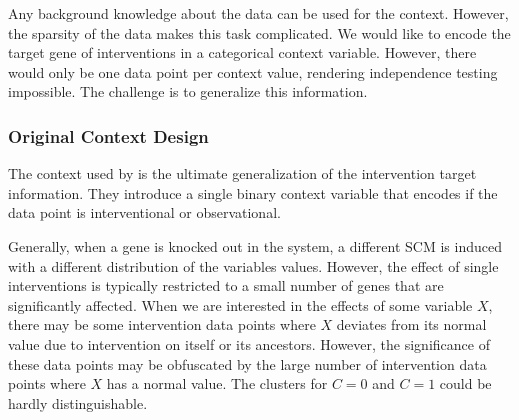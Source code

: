 Any background knowledge about the data can be used for the context. However, the sparsity of the data makes this task complicated. We would like to encode the target gene of interventions in a categorical context variable. However, there would only be one data point per context value, rendering independence testing impossible. The challenge is to generalize this information.

\subsubsection{Original Context Design}

The context used by \citet{versteeg2019boosting} is the ultimate generalization of the intervention target information. They introduce a single binary context variable that encodes if the data point is interventional or observational. 

Generally, when a gene is knocked out in the system, a different SCM is induced with a different distribution of the variables values. However, the effect of single interventions is typically restricted to a small number of genes that are significantly affected. When we are interested in the effects of some variable $X$, there may be some intervention data points where $X$ deviates from its normal value due to intervention on itself or its ancestors. However, the significance of these data points may be obfuscated by the large number of intervention data points where $X$ has a normal value. The clusters for $C=0$ and $C=1$ could be hardly distinguishable. 


 

